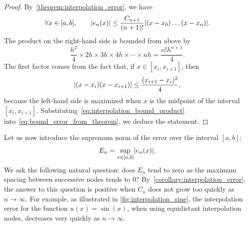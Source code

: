 \begin{proof}
By~\cref{theorem:interpolation_error},
we have
\begin{equation}
    \label{eq:bound_error_from_theorem}
    \forall x \in [a, b], \qquad
    \abs{e_n(x)} \leq \frac{C_{n+1}}{(n+1)!} \abs[Big]{(x-x_0) \dotsc (x-x_n)}.
\end{equation}
The product on the right-hand side is bounded from above by
\begin{equation}
    \label{eq:interpolation_bound_product}
    \frac{h^2}{4} \times 2h \times 3h \times 4h \times \dotsb \times nh = \frac{n! h^{n+1}}{4}.
\end{equation}
The first factor comes from the fact that, if $x \in [x_i, x_{i+1}]$,
then
\[
    \lvert(x - x_i)(x - x_{i+1})\rvert \leq \frac{(x_{i+1} - x_i)^2}{4},
\]
because the left-hand side is maximized when $x$ is the midpoint of the interval~$[x_i, x_{i+1}]$.
Substituting~\eqref{eq:interpolation_bound_product} into~\eqref{eq:bound_error_from_theorem},
we deduce the statement.
\end{proof}
Let us now introduce the supremum norm of the error over the interval $[a, b]$:
\[
    E_n = \sup_{x \in [a, b]} \lvert e_n(x)\rvert.
\]
We ask the following natural question:
does $E_n$ tend to zero as the maximum spacing between successive nodes tends to 0?
By~\cref{corollary:interpolation_error},
the answer to this question is positive when $C_{n}$ does not grow too quickly as $n \to \infty$.
For example, as illustrated in \cref{fig:interpolation_sine},
the interpolation error for the function $u(x) = \sin(x)$,
when using equidistant interpolation nodes,
decreases very quickly as $n \to \infty$.

